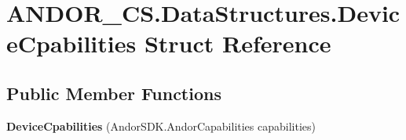 \hypertarget{struct_a_n_d_o_r___c_s_1_1_data_structures_1_1_device_cpabilities}{}\section{A\+N\+D\+O\+R\+\_\+\+C\+S.\+Data\+Structures.\+Device\+Cpabilities Struct Reference}
\label{struct_a_n_d_o_r___c_s_1_1_data_structures_1_1_device_cpabilities}
\subsection*{Public Member Functions}
\begin{DoxyCompactItemize}
\item 
\mbox{\label{struct_a_n_d_o_r___c_s_1_1_data_structures_1_1_device_cpabilities_aeee0227b0d8847a7e8f684ba4cf4b26c}} 
{\bfseries Device\+Cpabilities} (Andor\+S\+D\+K.\+Andor\+Capabilities capabilities)
\end{DoxyCompactItemize}
